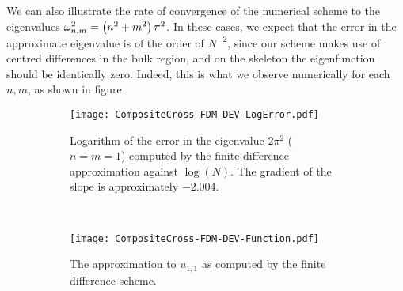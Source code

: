 We can also illustrate the rate of convergence of the numerical scheme to the eigenvalues $\omega_{n,m}^2 = \left( n^2+m^2 \right)\pi^2$.
In these cases, we expect that the error in the approximate eigenvalue is of the order of $N^{-2}$, since our scheme makes use of centred differences in the bulk region, and on the skeleton the eigenfunction should be identically zero.
Indeed, this is what we observe numerically for each $n,m$, as shown in figure 
\begin{figure}[h]
	\centering
	\begin{subfigure}[t]{0.35\textwidth}
		\centering
		\texttt{[image: CompositeCross-FDM-DEV-LogError.pdf]}
		\caption{\label{fig:CompositeCross-FDM-DEV-LogError} Logarithm of the error in the eigenvalue $2\pi^2$ ($n=m=1$) computed by the finite difference approximation against $\log(N)$. The gradient of the slope is approximately $-2.004$.}
	\end{subfigure}
	~
	\begin{subfigure}[t]{0.65\textwidth}
		\centering
		\texttt{[image: CompositeCross-FDM-DEV-Function.pdf]}
		\caption{\label{fig:CompositeCross-FDM-DEV-Function} The approximation to $u_{1,1}$ as computed by the finite difference scheme.}
	\end{subfigure}
	\caption{\label{fig:}}
\end{figure}

